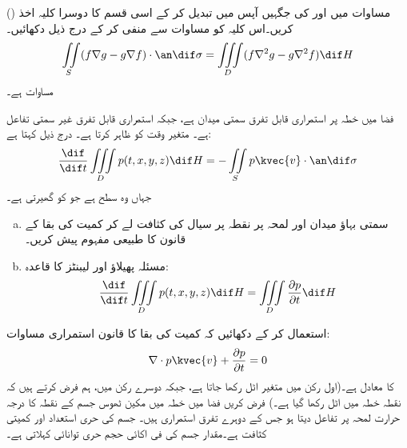 \quad ()
مساوات  میں  اور   کی جگہیں آپس میں تبدیل کر کے اسی قسم کا دوسرا کلیہ  اخذ کریں۔اس کلیہ کو مساوات  سے منفی کر کے درج ذیل دکھائیں۔
\begin{align}\label{مساوات_سمتی_میدان_گرین_کلیہ_دوم}
\iint\limits_S (f\nabla g-g\nabla f)\cdot \an\dif\sigma=\iiint\limits_D (f\nabla^2g-g\nabla^2f)\dif H
\end{align}
مساوات  ہے۔ 

\quad
فضا میں خطہ  پر   استمراری قابل تفرق سمتی میدان ہے، جبکہ   استمراری قابل تفرق غیر سمتی تفاعل ہے۔ متغیر  وقت کو ظاہر کرتا ہے۔ درج ذیل کہتا ہے:
\[\frac{\dif}{\dif t}\iiint\limits_D p(t,x,y,z)\dif H=-\iint\limits_S p\kvec{v}\cdot\an\dif\sigma\]
جہاں  وہ سطح ہے جو  کو گھیرتی ہے۔
\begin{enumerate}[a.]
\item
سمتی بہاؤ میدان   اور لمحہ   پر نقطہ  پر سیال کی کثافت  لے کر کمیت کی بقا کے قانون کا طبیعی مفہوم پیش کریں۔
\item
مسئلہ پھیلاؤ اور    لیبنٹز کا قاعدہ:
\[\frac{\dif}{\dif t}\iiint\limits_D p(t,x,y,z)\dif H=\iiint\limits_D \frac{\partial p}{\partial t}\dif H\]
\end{enumerate}
استعمال کر کے دکھائیں کہ کمیت کی بقا کا قانون استمراری مساوات:
\[\nabla \cdot p\kvec{v}+\frac{\partial p}{\partial t}=0\]
کا معادل  ہے۔(اول رکن   میں  متغیر  اٹل رکھا جاتا ہے، جبکہ دوسرے رکن  میں، ہم فرض کرتے ہیں کہ نقطہ  خطہ   میں   اٹل رکھا گیا ہے۔)
\quad
فرض کریں فضا میں خطہ   میں مکین  ٹھوس جسم  کے نقطہ  کا درجہ حرارت لمحہ  پر  تفاعل  دیتا ہو جس کے دوہرے تفرق  استمراری ہیں۔ جسم کی حری استعداد  اور کمیتی  کثافت  ہے۔مقدار  جسم کی  فی اکائی حجم حری توانائی کہلاتی ہے۔
